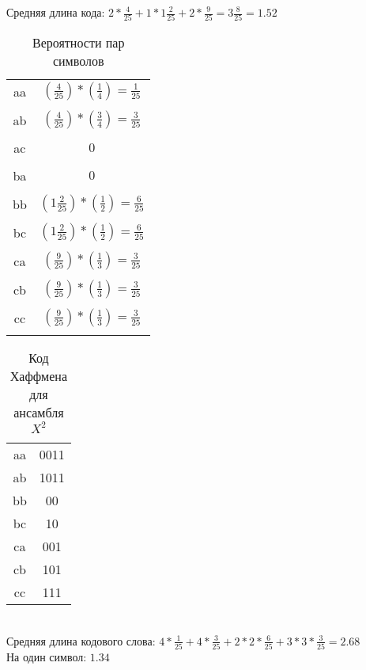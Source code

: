 \documentclass{article}
\begin{document}
Средняя длина кода: $2 * \frac{4}{25} + 1 * 1\frac{2}{25} + 2 * \frac{9}{25} = 3\frac{8}{25} = 1.52$

\begin{table}[H]
\begin{tabular}{|c|c|}
aa & $(\frac{4}{25}) * (\frac{1}{4}) = \frac{1}{25}$\\\\
ab & $(\frac{4}{25}) * (\frac{3}{4}) = \frac{3}{25}$\\\\
ac & $0$\\\\
ba & $0$\\\\
bb & $(1\frac{2}{25}) * (\frac{1}{2}) = \frac{6}{25}$\\\\
bc & $(1\frac{2}{25}) * (\frac{1}{2}) = \frac{6}{25}$\\\\
ca & $(\frac{9}{25}) * (\frac{1}{3}) = \frac{3}{25}$\\\\
cb & $(\frac{9}{25}) * (\frac{1}{3}) = \frac{3}{25}$\\\\
cc & $(\frac{9}{25}) * (\frac{1}{3}) = \frac{3}{25}$\\\\
\end{tabular}
\captionsetup{singlelinecheck=off,justification=raggedright}
\caption{\label{tab:widgets}Вероятности пар символов}
\end{table}


\begin{table}[H]
\begin{tabular}{|c|c|}
aa & 0011\\
ab & 1011\\
bb & 00\\
bc & 10\\
ca & 001\\
cb & 101\\
cc & 111\\
\end{tabular}
\captionsetup{singlelinecheck=off,justification=raggedright}
\caption{\label{tab:widgets}Код Хаффмена для ансамбля $X^2$}
\end{table}
\\

Средняя длина кодового слова: $4 * \frac{1}{25} + 4 * \frac{3}{25} + 2 * 2 * \frac{6}{25} + 3 * 3 * \frac{3}{25} = 2.68$\\
На один символ: $1.34$\\
\end{document}
